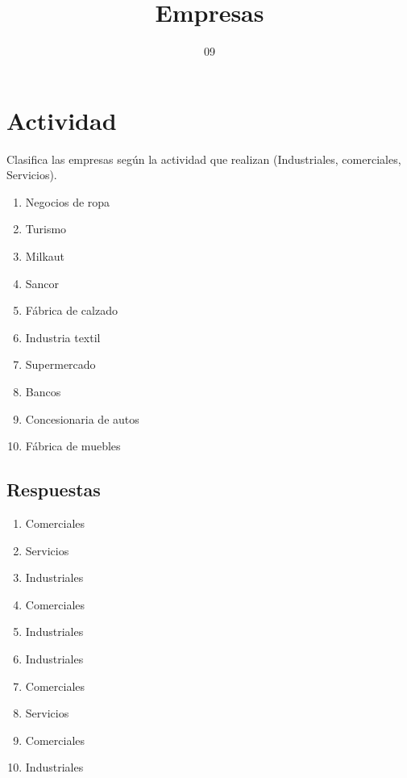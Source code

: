 \documentclass{report}
\title{Empresas}
\date{09 \- 04 \- 2025}
\begin{document}
\maketitle

\section*{Actividad}

Clasifica las empresas según la actividad que realizan (Industriales, comerciales, Servicios).

\begin{enumerate}
    \item Negocios de ropa
    \item Turismo
    \item Milkaut
    \item Sancor
    \item Fábrica de calzado
    \item Industria textil
    \item Supermercado
    \item Bancos
    \item Concesionaria de autos
    \item Fábrica de muebles
\end{enumerate}

\subsection*{Respuestas}

\begin{enumerate}
    \item Comerciales 
    \item Servicios
    \item Industriales
    \item Comerciales 
    \item Industriales 
    \item Industriales
    \item Comerciales
    \item Servicios
    \item Comerciales
    \item Industriales
\end{enumerate}
\end{document}
